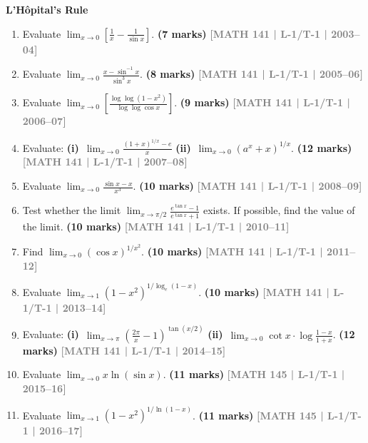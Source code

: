 \documentclass[12pt,a4paper]{article}
\newcommand{\yr}[1]{\hfill\textcolor{gray}{\small\textbf{[#1]}}}
\newcommand{\mk}[1]{\textcolor{orange!70!black}{\small\textbf{(#1 marks)}}}
\newcommand{\subtopic}[2]{%
  \vspace{10pt}
  \noindent\begin{tcolorbox}[colback=#1!8,colframe=#1,boxrule=0.6pt,arc=4pt,
    left=6pt,right=6pt,top=4pt,bottom=4pt]
    \small\bfseries\textcolor{#1}{#2}
  \end{tcolorbox}
  \vspace{2pt}
}
\begin{document}
\subtopic{cA}{L'H\^{o}pital's Rule}
\label{sub:s1-lhospital}

\begin{enumerate}

\item Evaluate $\displaystyle\lim_{x\to 0}\left[\frac{1}{x}-\frac{1}{\sin x}\right]$.
\mk{7} \yr{MATH 141 | L-1/T-1 | 2003--04}


\item Evaluate $\displaystyle\lim_{x\to 0}\frac{x-\sin^{-1}x}{\sin^{3}x}$.
\mk{8} \yr{MATH 141 | L-1/T-1 | 2005--06}

\item Evaluate $\displaystyle\lim_{x\to 0}\left[\frac{\log\log(1-x^{2})}{\log\log\cos x}\right]$.
\mk{9} \yr{MATH 141 | L-1/T-1 | 2006--07}

\item Evaluate: \textbf{(i)}~$\displaystyle\lim_{x\to 0}\frac{(1+x)^{1/x}-e}{x}$ \quad \textbf{(ii)}~$\displaystyle\lim_{x\to 0}(a^{x}+x)^{1/x}$.
\mk{12} \yr{MATH 141 | L-1/T-1 | 2007--08}

\item Evaluate $\displaystyle\lim_{x\to 0}\frac{\sin x - x}{x^{3}}$.
\mk{10} \yr{MATH 141 | L-1/T-1 | 2008--09}

\item Test whether the limit $\displaystyle\lim_{x\to\pi/2}\frac{e^{\tan x}-1}{e^{\tan x}+1}$ exists. If possible, find the value of the limit.
\mk{10} \yr{MATH 141 | L-1/T-1 | 2010--11}

\item Find $\displaystyle\lim_{x\to 0}(\cos x)^{1/x^{2}}$.
\mk{10} \yr{MATH 141 | L-1/T-1 | 2011--12}

\item Evaluate $\displaystyle\lim_{x\to 1}(1-x^{2})^{1/\log_{e}(1-x)}$.
\mk{10} \yr{MATH 141 | L-1/T-1 | 2013--14}

\item Evaluate: \textbf{(i)}~$\displaystyle\lim_{x\to\pi}\!\left(\frac{2\pi}{x}-1\right)^{\!\tan(x/2)}$ \quad \textbf{(ii)}~$\displaystyle\lim_{x\to 0}\cot x\cdot\log\frac{1-x}{1+x}$.
\mk{12} \yr{MATH 141 | L-1/T-1 | 2014--15}

\item Evaluate $\displaystyle\lim_{x\to 0}x\ln(\sin x)$.
\mk{11} \yr{MATH 145 | L-1/T-1 | 2015--16}

\item Evaluate $\displaystyle\lim_{x\to 1}(1-x^{2})^{1/\ln(1-x)}$.
\mk{11} \yr{MATH 145 | L-1/T-1 | 2016--17}


\end{enumerate}
\end{document}

